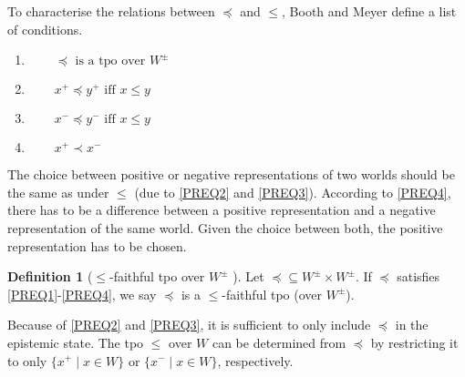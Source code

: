 \documentclass[english, 12pt]{scrartcl}
\theoremstyle{definition}
\theoremstyle{definition}
\newtheorem{definition}{Definition}
\theoremstyle{definition}
\begin{document}
To characterise the relations between $\preceq$ and $\leq$, Booth and Meyer define a list of conditions.

\begin{enumerate}[wide=0pt, widest=99,leftmargin=\parindent,label = ($\preceq\arabic*$)]
    \item\label{PREQ1} $\qquad \preceq \textrm{ is a tpo over } W^{\pm}$
    \item\label{PREQ2} $\qquad x^{+} \preceq y^{+} \textrm{ iff } x \leq y$
    \item\label{PREQ3} $\qquad x^{-} \preceq y^{-} \textrm{ iff } x \leq y$
    \item\label{PREQ4} $\qquad x^{+} \prec x^{-}$
\end{enumerate}

The choice between positive or negative representations of two worlds should be the same as under $\leq$ (due to \ref{PREQ2} and \ref{PREQ3}). According to \ref{PREQ4}, there has to be a difference between a positive representation and a negative representation of the same world. Given the choice between both, the positive representation has to be chosen.

\begin{definition}[$\leq$-faithful tpo over $W^{\pm}$ \cite{Booth2011}]
\label{definition:faithful-tpo}Let $\preceq \subseteq W^{\pm} \times W^{\pm}$. If $\preceq$ satisfies \ref{PREQ1}-\ref{PREQ4}, we say $\preceq$ is a $\leq$-faithful tpo (over $W^{\pm}$).
\end{definition}

Because of \ref{PREQ2} and \ref{PREQ3}, it is sufficient to only include $\preceq$ in the epistemic state. The tpo $\leq$ over $W$ can be determined from $\preceq$ by restricting it to only $\{ x^{+} \mid x \in W\}$ or $\{ x^{-} \mid x \in W\}$, respectively.
\end{document}
